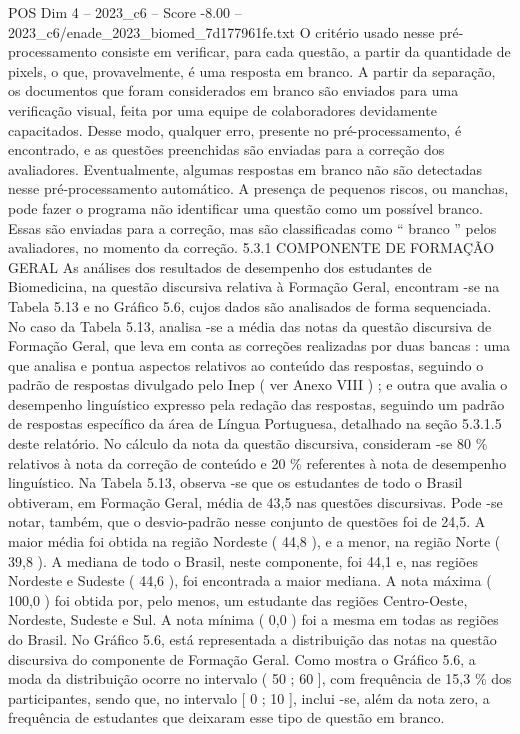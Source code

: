 \begin{textsample}{POS Dim 4 – 2023\_c6 – Score -8.00 – 2023\_c6/enade\_2023\_biomed\_7d177961fe.txt}
O critério usado nesse pré-processamento consiste em verificar, para cada questão, a partir da quantidade de pixels, o que, provavelmente, é uma resposta em branco.
A partir da separação, os documentos que foram considerados em branco são enviados para uma verificação visual, feita por uma equipe de colaboradores devidamente capacitados.
Desse modo, qualquer erro, presente no pré-processamento, é encontrado, e as questões preenchidas são enviadas para a correção dos avaliadores.
Eventualmente, algumas respostas em branco não são detectadas nesse pré-processamento automático.
A presença de pequenos riscos, ou manchas, pode fazer o programa não identificar uma questão como um possível branco.
Essas são enviadas para a correção, mas são classificadas como “ branco ” pelos avaliadores, no momento da correção. 5.3.1 COMPONENTE DE FORMAÇÃO GERAL As análises dos resultados de desempenho dos estudantes de Biomedicina, na questão discursiva relativa à Formação Geral, encontram -se na Tabela 5.13 e no Gráfico 5.6, cujos dados são analisados de forma sequenciada.
No caso da Tabela 5.13, analisa -se a média das notas da questão discursiva de Formação Geral, que leva em conta as correções realizadas por duas bancas : uma que analisa e pontua aspectos relativos ao conteúdo das respostas, seguindo o padrão de respostas divulgado pelo Inep ( ver Anexo VIII ) ; e outra que avalia o desempenho linguístico expresso pela redação das respostas, seguindo um padrão de respostas específico da área de Língua Portuguesa, detalhado na seção 5.3.1.5 deste relatório.
No cálculo da nota da questão discursiva, consideram -se 80 \% relativos à nota da correção de conteúdo e 20 \% referentes à nota de desempenho linguístico.
Na Tabela 5.13, observa -se que os estudantes de todo o Brasil obtiveram, em Formação Geral, média de 43,5 nas questões discursivas.
Pode -se notar, também, que o desvio-padrão nesse conjunto de questões foi de 24,5.
A maior média foi obtida na região Nordeste ( 44,8 ), e a menor, na região Norte ( 39,8 ).
A mediana de todo o Brasil, neste componente, foi 44,1 e, nas regiões Nordeste e Sudeste ( 44,6 ), foi encontrada a maior mediana.
A nota máxima ( 100,0 ) foi obtida por, pelo menos, um estudante das regiões Centro-Oeste, Nordeste, Sudeste e Sul.
A nota mínima ( 0,0 ) foi a mesma em todas as regiões do Brasil.
No Gráfico 5.6, está representada a distribuição das notas na questão discursiva do componente de Formação Geral.
Como mostra o Gráfico 5.6, a moda da distribuição ocorre no intervalo ( 50 ; 60 ], com frequência de 15,3 \% dos participantes, sendo que, no intervalo [ 0 ; 10 ], inclui -se, além da nota zero, a frequência de estudantes que deixaram esse tipo de questão em branco.

\end{textsample}
